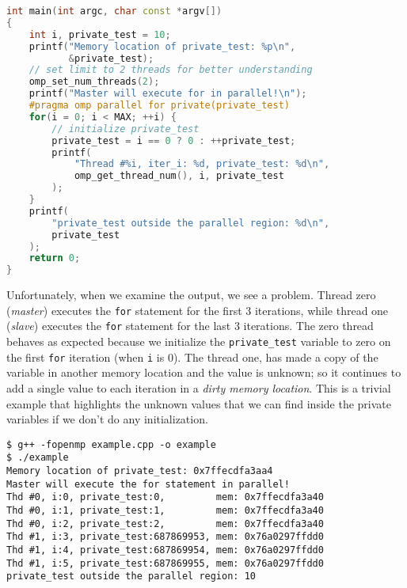 \begin{examplebox}
\begin{lstlisting}[language=C++]
int main(int argc, char const *argv[])
{
    int i, private_test = 10;
    printf("Memory location of private_test: %p\n",
           &private_test);
    // set limit to 2 threads for better understanding
    omp_set_num_threads(2);
    printf("Master will execute for in parallel!\n");
    #pragma omp parallel for private(private_test)
    for(i = 0; i < MAX; ++i) {
        // initialize private_test
        private_test = i == 0 ? 0 : ++private_test;
        printf(
            "Thread #%i, iter_i: %d, private_test: %d\n", 
            omp_get_thread_num(), i, private_test
        );
    }
    printf(
        "private_test outside the parallel region: %d\n", 
        private_test
    );
    return 0;
}\end{lstlisting}
    Unfortunately, when we examine the output, we see a problem. Thread zero (\emph{master}) executes the \texttt{for} statement for the first 3 iterations, while thread one (\emph{slave}) executes the \texttt{for} statement for the last 3 iterations. The zero thread behaves as expected because we initialize the \texttt{private\_test} variable to zero on the first \texttt{for} iteration (when \texttt{i} is 0). The thread one, has made a copy of the variable in another memory location and the value is unknown; so it continues to add a single value to each iteration in a \emph{dirty memory location}. This is a trivial example that highlights the unknown values that we can find inside the private variables if we don't do any initialization.
    \begin{lstlisting}[mathescape=false]
$ g++ -fopenmp example.cpp -o example
$ ./example
Memory location of private_test: 0x7ffecdfa3aa4
Master will execute the for statement in parallel!
Thd #0, i:0, private_test:0,         mem: 0x7ffecdfa3a40
Thd #0, i:1, private_test:1,         mem: 0x7ffecdfa3a40
Thd #0, i:2, private_test:2,         mem: 0x7ffecdfa3a40
Thd #1, i:3, private_test:687869953, mem: 0x76a0297ffdd0
Thd #1, i:4, private_test:687869954, mem: 0x76a0297ffdd0
Thd #1, i:5, private_test:687869955, mem: 0x76a0297ffdd0
private_test outside the parallel region: 10\end{lstlisting}
\end{examplebox}

\newpage

